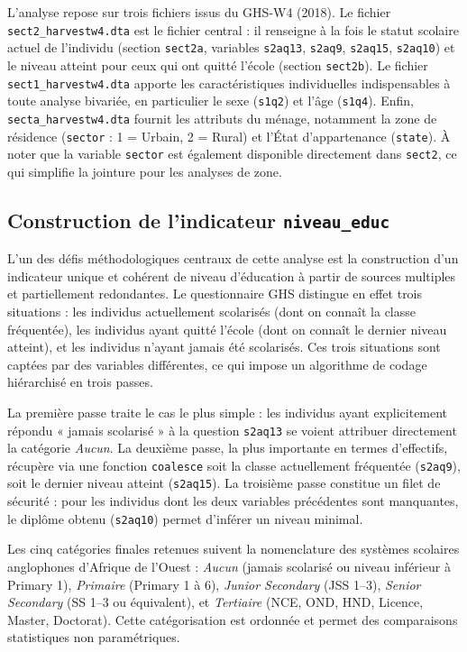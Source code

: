 \documentclass[
]{article}
\begin{document}
L'analyse repose sur trois fichiers issus du GHS-W4 (2018). Le fichier
\texttt{sect2\_harvestw4.dta} est le fichier central : il renseigne à la
fois le statut scolaire actuel de l'individu (section \texttt{sect2a},
variables \texttt{s2aq13}, \texttt{s2aq9}, \texttt{s2aq15},
\texttt{s2aq10}) et le niveau atteint pour ceux qui ont quitté l'école
(section \texttt{sect2b}). Le fichier \texttt{sect1\_harvestw4.dta}
apporte les caractéristiques individuelles indispensables à toute
analyse bivariée, en particulier le sexe (\texttt{s1q2}) et l'âge
(\texttt{s1q4}). Enfin, \texttt{secta\_harvestw4.dta} fournit les
attributs du ménage, notamment la zone de résidence (\texttt{sector} : 1
= Urbain, 2 = Rural) et l'État d'appartenance (\texttt{state}). À noter
que la variable \texttt{sector} est également disponible directement
dans \texttt{sect2}, ce qui simplifie la jointure pour les analyses de
zone.

\subsection{\texorpdfstring{Construction de l'indicateur
\texttt{niveau\_educ}}{Construction de l'indicateur niveau\_educ}}\label{construction-de-lindicateur-niveau_educ}

L'un des défis méthodologiques centraux de cette analyse est la
construction d'un indicateur unique et cohérent de niveau d'éducation à
partir de sources multiples et partiellement redondantes. Le
questionnaire GHS distingue en effet trois situations : les individus
actuellement scolarisés (dont on connaît la classe fréquentée), les
individus ayant quitté l'école (dont on connaît le dernier niveau
atteint), et les individus n'ayant jamais été scolarisés. Ces trois
situations sont captées par des variables différentes, ce qui impose un
algorithme de codage hiérarchisé en trois passes.

La première passe traite le cas le plus simple : les individus ayant
explicitement répondu « jamais scolarisé » à la question \texttt{s2aq13}
se voient attribuer directement la catégorie \emph{Aucun}. La deuxième
passe, la plus importante en termes d'effectifs, récupère via une
fonction \texttt{coalesce} soit la classe actuellement fréquentée
(\texttt{s2aq9}), soit le dernier niveau atteint (\texttt{s2aq15}). La
troisième passe constitue un filet de sécurité : pour les individus dont
les deux variables précédentes sont manquantes, le diplôme obtenu
(\texttt{s2aq10}) permet d'inférer un niveau minimal.

Les cinq catégories finales retenues suivent la nomenclature des
systèmes scolaires anglophones d'Afrique de l'Ouest : \emph{Aucun}
(jamais scolarisé ou niveau inférieur à Primary 1), \emph{Primaire}
(Primary 1 à 6), \emph{Junior Secondary} (JSS 1--3), \emph{Senior
Secondary} (SS 1--3 ou équivalent), et \emph{Tertiaire} (NCE, OND, HND,
Licence, Master, Doctorat). Cette catégorisation est ordonnée et permet
des comparaisons statistiques non paramétriques.
\end{document}
